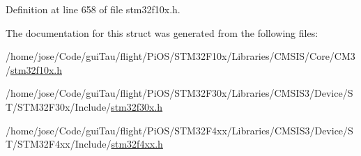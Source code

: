 Definition at line 658 of file stm32f10x.\-h.



The documentation for this struct was generated from the following files\-:\begin{DoxyCompactItemize}
\item 
/home/jose/\-Code/gui\-Tau/flight/\-Pi\-O\-S/\-S\-T\-M32\-F10x/\-Libraries/\-C\-M\-S\-I\-S/\-Core/\-C\-M3/\hyperlink{stm32f10x_8h}{stm32f10x.\-h}\item 
/home/jose/\-Code/gui\-Tau/flight/\-Pi\-O\-S/\-S\-T\-M32\-F30x/\-Libraries/\-C\-M\-S\-I\-S3/\-Device/\-S\-T/\-S\-T\-M32\-F30x/\-Include/\hyperlink{stm32f30x_8h}{stm32f30x.\-h}\item 
/home/jose/\-Code/gui\-Tau/flight/\-Pi\-O\-S/\-S\-T\-M32\-F4xx/\-Libraries/\-C\-M\-S\-I\-S3/\-Device/\-S\-T/\-S\-T\-M32\-F4xx/\-Include/\hyperlink{stm32f4xx_8h}{stm32f4xx.\-h}\end{DoxyCompactItemize}
